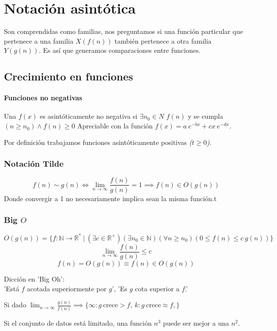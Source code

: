 \chapter{Notación asintótica}

Son comprendidas como familias, nos preguntamos si una función particular que pertenece a una familia $X(f(n))$ también pertenece a otra familia $Y(g(n))$. Es así que generamos comparaciones entre funciones.
\section{Crecimiento en funciones}
\subsubsection{Funciones no negativas}
Una $f(x)$ es asintóticamente no negativa si $\exists n_0\in N$ $f(n)$ y se cumpla $(n\ge n_0)\land f(n)\ge0$
Apreciable con la función $f(x)=a~e^{-bx}+cx~e^{-dx}$.

Por definición trabajamos funciones asintóticamente positivas \textit{($t\ge0$)}.

\subsection{Notación Tilde}
$$
	f(n)\sim g(n)\iff\lim_{n\to\infty}\frac{f(n)}{g(n)}=1\implies f(n)\in O(g(n))
$$
Donde convergir a 1 no necesariamente implica sean la misma función.t

\subsection{Big $O$}
\begin{definition}$$
		O(g(n))
		=\{
		f: \mathbb N\to \mathbb R^*~|~(\exists c\in \mathbb R^+)
		(\exists n_0\in \mathbb N)
		(\forall n\ge n_0)
		(0\le f(n)\le c~g(n))
		\}
	$$
	$$
		\lim_{n\to\infty}\frac{f(n)}{g(n)}\leq c
	$$$$
		f(n)=O(g(n))\equiv f(n)\in O(g(n))
	$$
\end{definition}
\begin{remark}Dicción en 'Big Oh':\\
	'Está $f$ acotada superiormente por $g$', 'Es $g$ cota superior a $f$.'
\end{remark}

Si dado $\lim_{n\to\infty}\frac{g(n)}{f(n)}\implies\{\infty: g~\text{crece} > f,~k:g~\text{crece} \approx f,\}$

Si el conjunto de datos está limitado, una función $n^3$ puede ser mejor a una $n^2$.

